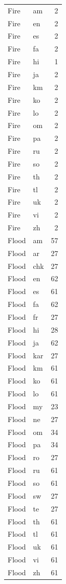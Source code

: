 \begin{longtable}{p{3cm} p{3cm} r}
Fire & am & 2 \\
Fire & en & 2 \\
Fire & es & 2 \\
Fire & fa & 2 \\
Fire & hi & 1 \\
Fire & ja & 2 \\
Fire & km & 2 \\
Fire & ko & 2 \\
Fire & lo & 2 \\
Fire & om & 2 \\
Fire & pa & 2 \\
Fire & ru & 2 \\
Fire & so & 2 \\
Fire & th & 2 \\
Fire & tl & 2 \\
Fire & uk & 2 \\
Fire & vi & 2 \\
Fire & zh & 2 \\
Flood & am & 57 \\
Flood & ar & 27 \\
Flood & chk & 27 \\
Flood & en & 62 \\
Flood & es & 61 \\
Flood & fa & 62 \\
Flood & fr & 27 \\
Flood & hi & 28 \\
Flood & ja & 62 \\
Flood & kar & 27 \\
Flood & km & 61 \\
Flood & ko & 61 \\
Flood & lo & 61 \\
Flood & my & 23 \\
Flood & ne & 27 \\
Flood & om & 34 \\
Flood & pa & 34 \\
Flood & ro & 27 \\
Flood & ru & 61 \\
Flood & so & 61 \\
Flood & sw & 27 \\
Flood & te & 27 \\
Flood & th & 61 \\
Flood & tl & 61 \\
Flood & uk & 61 \\
Flood & vi & 61 \\
Flood & zh & 61 \\

\end{longtable}
